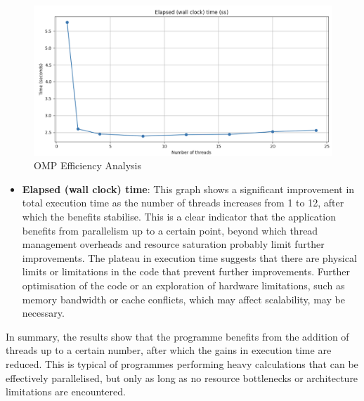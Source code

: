 \documentclass[
]{article}
\providecommand{\tightlist}{%
  \setlength{\itemsep}{0pt}\setlength{\parskip}{0pt}}
\begin{document}
\begin{figure}
\includegraphics[width=1\linewidth]{figures/eff_omp_3.png}
\caption{OMP Efficiency Analysis}
\label{}
\end{figure}

\begin{itemize}
\tightlist
\item
  \textbf{Elapsed (wall clock) time}: This graph shows a significant
  improvement in total execution time as the number of threads increases
  from 1 to 12, after which the benefits stabilise. This is a clear
  indicator that the application benefits from parallelism up to a
  certain point, beyond which thread management overheads and resource
  saturation probably limit further improvements. The plateau in
  execution time suggests that there are physical limits or limitations
  in the code that prevent further improvements. Further optimisation of
  the code or an exploration of hardware limitations, such as memory
  bandwidth or cache conflicts, which may affect scalability, may be
  necessary.
\end{itemize}

In summary, the results show that the programme benefits from the
addition of threads up to a certain number, after which the gains in
execution time are reduced. This is typical of programmes performing
heavy calculations that can be effectively parallelised, but only as
long as no resource bottlenecks or architecture limitations are
encountered.
\end{document}
